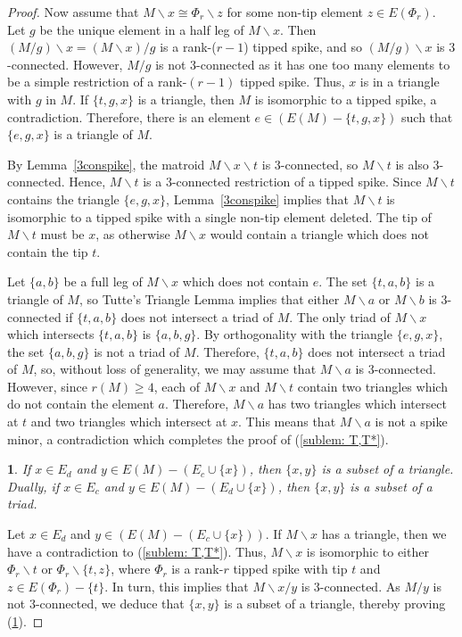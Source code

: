 \documentclass[11pt]{amsart}
\newtheorem{sublemma}{}[theorem]
\numberwithin{equation}{section} %
\begin{document}
\begin{proof}
Now assume that $M\backslash x\cong \Phi_r\backslash z$ for some non-tip element $z\in E(\Phi_r)$. Let $g$ be the unique element in a half leg of $M \backslash x$. Then $(M/g)\backslash x=(M\backslash x)/ g$ is a rank-($r-1$) tipped spike, and so $(M/g)\backslash x$ is $3$-connected. However, $M/g$ is not $3$-connected as it has one too many elements to be a simple restriction of a rank-$(r-1)$ tipped spike. Thus, $x$ is in a triangle with $g$ in $M$. If $\{t, g, x\}$ is a triangle, then $M$ is isomorphic to a tipped spike, a contradiction. Therefore, there is an element $e\in (E(M)-\{t, g, x\})$ such that $\{e, g, x\}$ is a triangle of $M$.

By Lemma~\ref{3conspike}, the matroid $M \backslash x \backslash t$ is $3$-connected, so $M \backslash t$ is also $3$-connected. Hence, $M \backslash t$ is a $3$-connected restriction of a tipped spike. Since $M \backslash t$ contains the triangle $\{e,g,x\}$, Lemma~\ref{3conspike} implies that $M \backslash t$ is isomorphic to a tipped spike with a single non-tip element deleted. The tip of $M \backslash t$ must be $x$, as otherwise $M \backslash x$ would contain a triangle which does not contain the tip $t$.

Let $\{a,b\}$ be a full leg of $M \backslash x$ which does not contain $e$. The set $\{t,a,b\}$ is a triangle of $M$, so Tutte's Triangle Lemma implies that either $M \backslash a$ or $M \backslash b$ is $3$-connected if $\{t,a,b\}$ does not intersect a triad of $M$. The only triad of $M \backslash x$ which intersects $\{t,a,b\}$ is $\{a,b,g\}$. By orthogonality with the triangle $\{e,g,x\}$, the set $\{a,b,g\}$ is not a triad of $M$. Therefore, $\{t,a,b\}$ does not intersect a triad of $M$, so, without loss of generality, we may assume that $M \backslash a$ is $3$-connected. However, since $r(M) \geq 4$, each of $M \backslash x$ and $M \backslash t$ contain two triangles which do not contain the element $a$. Therefore, $M \backslash a$ has two triangles which intersect at $t$ and two triangles which intersect at $x$. This means that $M \backslash a$ is not a spike minor, a contradiction which completes the proof of (\ref{sublem: T,T*}).

\begin{sublemma}
\label{sublem: xy}
If $x\in E_d$ and $y\in E(M)-(E_c\cup \{x\})$, then $\{x, y\}$ is a subset of a triangle. Dually, if $x\in E_c$ and $y\in E(M)-(E_d\cup \{x\})$, then $\{x, y\}$ is a subset of a triad.
\end{sublemma}

Let $x\in E_d$ and $y\in (E(M)-(E_c \cup \{x\}))$. If $M\backslash x$ has a triangle, then we have a contradiction to (\ref{sublem: T,T*}). Thus, $M\backslash x$ is isomorphic to either $\Phi_r\backslash t$ or $\Phi_r\backslash \{t, z\}$, where $\Phi_r$ is a rank-$r$ tipped spike with tip $t$ and $z\in E(\Phi_r)-\{t\}$. In turn, this implies that $M\backslash x/y$ is $3$-connected. As $M/y$ is not $3$-connected, we deduce that $\{x, y\}$ is a subset of a triangle, thereby proving (\ref{sublem: xy}).


\end{proof}
\end{document}
